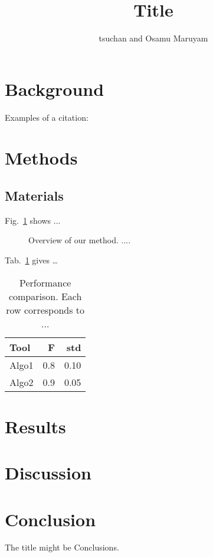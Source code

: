 \documentclass{article}
\begin{document}
    \title{Title}    
    \author{tsuchan and Osamu Maruyam}
    \maketitle

    \section{Background}

    Examples of a citation: 
    \cite{Narlikar2006Informative}

    \cite{Narlikar2007Nucleosome}

    \section{Methods}

    \subsection{Materials}

    Fig.~\ref{fig:overview} shows ...

    
    \begin{figure}[h]
        \label{fig:overview}
        \caption{Overview of our method. ....}
    \end{figure}
    

    Tab.~\ref{tab:comparison} gives \dots

    \begin{table}[h]
        \begin{center}
            \label{tab:comparison}
            \caption{Performance comparison. Each row corresponds to ... }
            \begin{tabular}{l|rr}
                Tool & F & std \\\hline
                Algo1 & 0.8 & 0.10 \\
                Algo2 & 0.9 & 0.05 
            \end{tabular}
        \end{center}
      \end{table}





    \section{Results}

    \section{Discussion}

    \section{Conclusion}
    The title might be Conclusions. 

    
       
\end{document}
